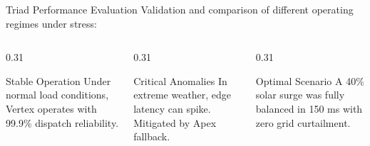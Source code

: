 \begin{frame}{Triad Performance Evaluation}
  Validation and comparison of different operating regimes under stress:
  \vspace{0.4cm}
  
  \begin{columns}[T]
    \begin{column}{0.31\textwidth}
      \begin{block}{Stable Operation}
        Under normal load conditions, Vertex operates with 99.9\% dispatch reliability.
      \end{block}
    \end{column}
    \begin{column}{0.31\textwidth}
      \begin{alertblock}{Critical Anomalies}
        In extreme weather, edge latency can spike. Mitigated by Apex fallback.
      \end{alertblock}
    \end{column}
    \begin{column}{0.31\textwidth}
      \begin{exampleblock}{Optimal Scenario}
        A 40\% solar surge was fully balanced in 150 ms with zero grid curtailment.
      \end{exampleblock}
    \end{column}
  \end{columns}
\end{frame}

